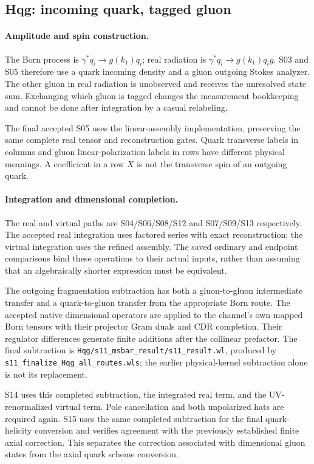 \documentclass[11pt,a4paper]{article}
\newcommand{\code}[1]{{\small\nolinkurl{#1}}}
\begin{document}
\subsection{Hqg: incoming quark, tagged gluon}
\paragraph{Amplitude and spin construction.}
The Born process is $\gamma^*q_i\to g(k_1)q_i$; real radiation is $\gamma^*q_i\to g(k_1)q_i g$. S03 and S05 therefore use a quark incoming density and a gluon outgoing Stokes analyzer. The other gluon in real radiation is unobserved and receives the unresolved state sum. Exchanging which gluon is tagged changes the measurement bookkeeping and cannot be done after integration by a casual relabeling.

The final accepted S05 uses the linear-assembly implementation, preserving the same complete real tensor and reconstruction gates. Quark transverse labels in columns and gluon linear-polarization labels in rows have different physical meanings. A coefficient in a row $X$ is not the transverse spin of an outgoing quark.

\paragraph{Integration and dimensional completion.}
The real and virtual paths are S04/S06/S08/S12 and S07/S09/S13 respectively. The accepted real integration uses factored series with exact reconstruction; the virtual integration uses the refined assembly. The saved ordinary and endpoint comparisons bind these operations to their actual inputs, rather than assuming that an algebraically shorter expression must be equivalent.

The outgoing fragmentation subtraction has both a gluon-to-gluon intermediate transfer and a quark-to-gluon transfer from the appropriate Born route. The accepted native dimensional operators are applied to the channel's own mapped Born tensors with their projector Gram duals and CDR completion. Their regulator differences generate finite additions after the collinear prefactor. The final subtraction is \code{Hqg/s11_msbar_result/s11_result.wl}, produced by \code{s11_finalize_Hqg_all_routes.wls}; the earlier physical-kernel subtraction alone is not its replacement.

S14 uses this completed subtraction, the integrated real term, and the UV-renormalized virtual term. Pole cancellation and both unpolarized hats are required again. S15 uses the same completed subtraction for the final quark-helicity conversion and verifies agreement with the previously established finite axial correction. This separates the correction associated with dimensional gluon states from the axial quark scheme conversion.
\end{document}
